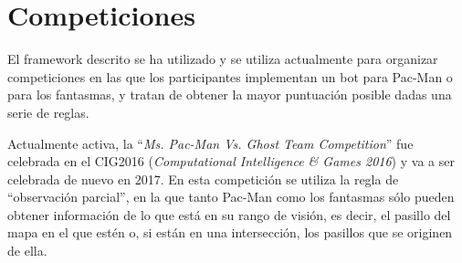 \section{Competiciones}
El framework descrito se ha utilizado y se utiliza actualmente para organizar competiciones en las que los participantes implementan un bot para Pac-Man o para los fantasmas, y tratan de obtener la mayor puntuación posible dadas una serie de reglas.
 
Actualmente activa, la ``\textit{Ms. Pac-Man Vs. Ghost Team Competition}'' fue celebrada en el CIG2016 \cite{CIG2016Page} (\textit{Computational Intelligence \& Games 2016}) y va a ser celebrada de nuevo en 2017. En esta competición se utiliza la regla de ``observación parcial'', en la que tanto Pac-Man como los fantasmas sólo pueden obtener información de lo que está en su rango de visión, es decir, el pasillo del mapa en el que estén o, si están en una intersección, los pasillos que se originen de ella.
